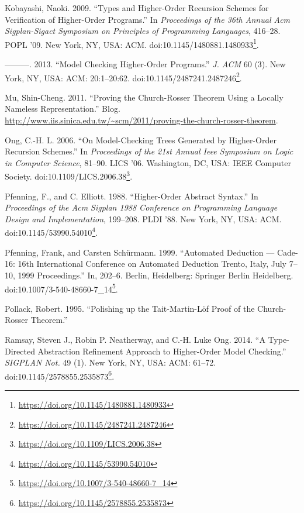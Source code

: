\documentclass[a4paper, 12pt, twoside]{style/ociamthesis}
\theoremstyle{plain}
\theoremstyle{definition}
\theoremstyle{remark}
\renewcommand{\href}[2]{#2\footnote{\url{#1}}}
\begin{document}
\hypertarget{ref-kobayashi09}{}
Kobayashi, Naoki. 2009. ``Types and Higher-Order Recursion Schemes for
Verification of Higher-Order Programs.'' In \emph{Proceedings of the
36th Annual Acm Sigplan-Sigact Symposium on Principles of Programming
Languages}, 416--28. POPL '09. New York, NY, USA: ACM.
doi:\href{https://doi.org/10.1145/1480881.1480933}{10.1145/1480881.1480933}.

\hypertarget{ref-kobayashi13}{}
---------. 2013. ``Model Checking Higher-Order Programs.'' \emph{J. ACM}
60 (3). New York, NY, USA: ACM: 20:1--20:62.
doi:\href{https://doi.org/10.1145/2487241.2487246}{10.1145/2487241.2487246}.

\hypertarget{ref-shing-cheng}{}
Mu, Shin-Cheng. 2011. ``Proving the Church-Rosser Theorem Using a
Locally Nameless Representation.'' Blog.
\url{http://www.iis.sinica.edu.tw/~scm/2011/proving-the-church-rosser-theorem}.

\hypertarget{ref-ong06}{}
Ong, C.-H. L. 2006. ``On Model-Checking Trees Generated by Higher-Order
Recursion Schemes.'' In \emph{Proceedings of the 21st Annual Ieee
Symposium on Logic in Computer Science}, 81--90. LICS '06. Washington,
DC, USA: IEEE Computer Society.
doi:\href{https://doi.org/10.1109/LICS.2006.38}{10.1109/LICS.2006.38}.

\hypertarget{ref-pfenning88}{}
Pfenning, F., and C. Elliott. 1988. ``Higher-Order Abstract Syntax.'' In
\emph{Proceedings of the Acm Sigplan 1988 Conference on Programming
Language Design and Implementation}, 199--208. PLDI '88. New York, NY,
USA: ACM.
doi:\href{https://doi.org/10.1145/53990.54010}{10.1145/53990.54010}.

\hypertarget{ref-pfenning99}{}
Pfenning, Frank, and Carsten Schürmann. 1999. ``Automated Deduction ---
Cade-16: 16th International Conference on Automated Deduction Trento,
Italy, July 7--10, 1999 Proceedings.'' In, 202--6. Berlin, Heidelberg:
Springer Berlin Heidelberg.
doi:\href{https://doi.org/10.1007/3-540-48660-7_14}{10.1007/3-540-48660-7\_14}.

\hypertarget{ref-pollack95}{}
Pollack, Robert. 1995. ``Polishing up the Tait-Martin-Löf Proof of the
Church-Rosser Theorem.''

\hypertarget{ref-ramsay14}{}
Ramsay, Steven J., Robin P. Neatherway, and C.-H. Luke Ong. 2014. ``A
Type-Directed Abstraction Refinement Approach to Higher-Order Model
Checking.'' \emph{SIGPLAN Not.} 49 (1). New York, NY, USA: ACM: 61--72.
doi:\href{https://doi.org/10.1145/2578855.2535873}{10.1145/2578855.2535873}.
\end{document}
